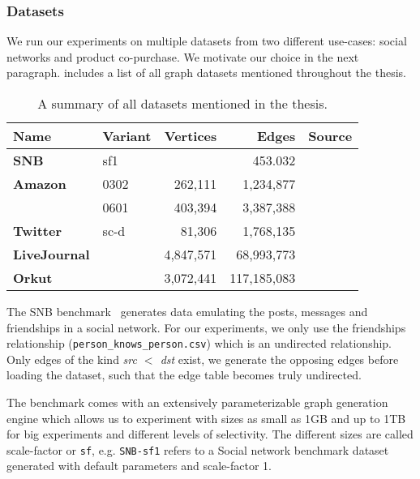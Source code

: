 \subsubsection{Datasets}
We run our experiments on multiple datasets from two different use-cases: social networks and product co-purchase.
We motivate our choice in the next paragraph.
 includes a list of all graph datasets mentioned throughout the thesis.

\begin{table}[]
    \centering
    \begin{tabular}{llrrl} \toprule
    Name    & Variant              &  Vertices   & Edges          & Source          \\ \midrule
    \textbf{SNB}         & sf1     &             &  453.032       & \cite{snb}      \\
    \textbf{Amazon}      & 0302    & 262,111     &  1,234,877     & \cite{snapnets} \\
    & 0601    & 403,394     &  3,387,388     & \cite{snapnets} \\
    \textbf{Twitter}     & sc-d    & 81,306      &  1,768,135     & \cite{snapnets} \\
    \textbf{LiveJournal} &         & 4,847,571   & 68,993,773     & \cite{snapnets} \\
    \textbf{Orkut}       &         & 3,072,441   & 117,185,083    & \cite{snapnets} \\ \bottomrule
    \end{tabular}
    \caption{A summary of all datasets mentioned in the thesis.}
    \label{table:datasets}
\end{table}

The SNB benchmark~\cite{snb} generates data emulating the posts, messages and friendships in a social network.
For our experiments, we only use the friendships relationship (\texttt{person\_knows\_person.csv}) which is an undirected relationship.
Only edges of the kind \textit{src $<$ dst} exist, we generate the opposing edges before loading the dataset, such
that the edge table becomes truly undirected.

The benchmark comes with an extensively parameterizable graph generation engine
which allows us to experiment with sizes as small as 1GB and up to 1TB for big experiments and different levels of selectivity.
The different sizes are called scale-factor or \texttt{sf}, e.g. \texttt{SNB-sf1} refers to a Social network benchmark dataset generated with
default parameters and scale-factor 1.

